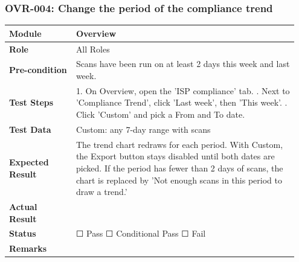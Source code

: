 \documentclass[10pt]{article}
\begin{document}
\subsubsection*{OVR-004: Change the period of the compliance trend}
\begin{longtable}{p{0.22\linewidth}p{0.73\linewidth}}
\hline
\textbf{Module} & Overview \\ \hline
\textbf{Role} & All Roles \\ \hline
\textbf{Pre-condition} & Scans have been run on at least 2 days this week and last week. \\ \hline
\textbf{Test Steps} & 1. On Overview, open the 'ISP compliance' tab. \newline 2. Next to 'Compliance Trend', click 'Last week', then 'This week'. \newline 3. Click 'Custom' and pick a From and To date. \\ \hline
\textbf{Test Data} & Custom: any 7-day range with scans \\ \hline
\textbf{Expected Result} & The trend chart redraws for each period. With Custom, the Export button stays disabled until both dates are picked. If the period has fewer than 2 days of scans, the chart is replaced by 'Not enough scans in this period to draw a trend.' \\ \hline
\textbf{Actual Result} & \newline \newline \\ \hline
\textbf{Status} & ☐ Pass \quad ☐ Conditional Pass \quad ☐ Fail \\ \hline
\textbf{Remarks} & \newline \\ \hline
\end{longtable}
\end{document}
